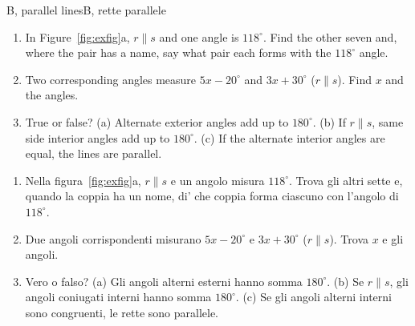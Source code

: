 \begin{exercise}{B, parallel lines}{B, rette parallele}
\begin{enumerate}[label=\textbf{B\arabic*.}, leftmargin=2.2em]
\item In Figure~\ref{fig:exfig}a, $r \parallel s$ and one angle is $118^\circ$. Find the other seven and, where the pair has a name, say what pair each forms with the $118^\circ$ angle.
\item Two corresponding angles measure $5x - 20^\circ$ and $3x + 30^\circ$ ($r \parallel s$). Find $x$ and the angles.
\item True or false? (a) Alternate exterior angles add up to $180^\circ$. (b) If $r \parallel s$, same side interior angles add up to $180^\circ$. (c) If the alternate interior angles are equal, the lines are parallel.
\end{enumerate}
\tcblower
\begin{enumerate}[label=\textbf{B\arabic*.}, leftmargin=2.2em]
\item Nella figura~\ref{fig:exfig}a, $r \parallel s$ e un angolo misura $118^\circ$. Trova gli altri sette e, quando la coppia ha un nome, di' che coppia forma ciascuno con l'angolo di $118^\circ$.
\item Due angoli corrispondenti misurano $5x - 20^\circ$ e $3x + 30^\circ$ ($r \parallel s$). Trova $x$ e gli angoli.
\item Vero o falso? (a) Gli angoli alterni esterni hanno somma $180^\circ$. (b) Se $r \parallel s$, gli angoli coniugati interni hanno somma $180^\circ$. (c) Se gli angoli alterni interni sono congruenti, le rette sono parallele.
\end{enumerate}
\end{exercise}

